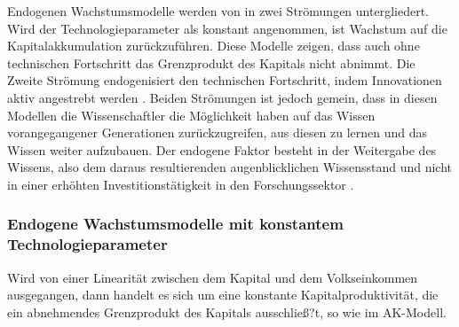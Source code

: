 %
Endogenen Wachstumsmodelle werden von \cite{Frenkel.1999} in zwei Strömungen untergliedert. Wird der Technologieparameter als konstant angenommen, ist Wachstum auf die Kapitalakkumulation zurückzuführen. Diese Modelle zeigen, dass auch ohne technischen Fortschritt das Grenzprodukt des Kapitals nicht abnimmt. Die Zweite Strömung endogenisiert den technischen Fortschritt, indem Innovationen aktiv angestrebt werden \cite{Frenkel.1999}. Beiden Strömungen ist jedoch gemein, dass in diesen Modellen  die Wissenschaftler die Möglichkeit haben auf das Wissen vorangegangener Generationen zurückzugreifen, aus diesen zu lernen und das Wissen weiter aufzubauen. Der endogene Faktor besteht in der Weitergabe des Wissens, also dem daraus resultierenden augenblicklichen Wissensstand und nicht in einer erhöhten Investitionstätigkeit in den Forschungssektor \cite{Romer.1990,Rebelo.1991}.
%
\subsubsection{Endogene Wachstumsmodelle mit konstantem Technologieparameter}
%
Wird von einer Linearität zwischen dem Kapital und dem Volkseinkommen ausgegangen, dann handelt es sich um eine konstante Kapitalproduktivität, die ein abnehmendes Grenzprodukt des Kapitals ausschließ?t, so wie im AK-Modell. 
%
